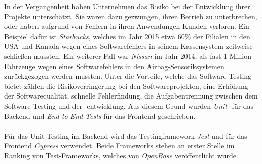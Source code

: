 In der Vergangenheit haben Unternehmen das Risiko bei der Entwicklung ihrer Projekte unterschätzt. Sie waren dazu gezwungen, ihren Betrieb zu unterbrechen, oder haben aufgrund von Fehlern in ihren Anwendungen Kunden verloren. Ein Beispiel dafür ist \textit{Starbucks}, welches im Jahr 2015 etwa 60\% der Filialen in den USA und Kanada wegen eines Softwarefehlers in seinem Kassensystem zeitweise schließen mussten{\cite{QS1}}. Ein weiterer Fall war \textit{Nissan} im Jahr 2014, als fast 1 Million Fahrzeuge wegen eines Softwarefehlers in den Airbag-Sensoriksystemen zurückgezogen werden mussten{\cite{QS2}}. Unter die Vorteile, welche das Software-Testing bietet zählen die Risikoverringerung bei den Softwareprojekten, eine Erhöhung der Softwarequalität, schnelle Fehlerfindung, die Aufgabentrennung zwischen dem Software-Testing und der -entwicklung.  Aus diesem Grund wurden \textit{Unit-} für das Backend und \textit{End-to-End-Tests} für das Frontend geschrieben. 
\\\\
Für das Unit-Testing im Backend wird das Testingframework \textit{Jest} und für das Frontend \textit{Cypress} verwendet. Beide Frameworks stehen an erster Stelle im Ranking von Test-Frameworks, welches von \textit{OpenBase} veröffentlicht wurde{\cite{QS3}}.

